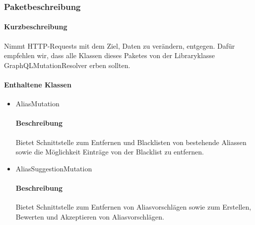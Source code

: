 \subsubsection*{Paketbeschreibung}%
\paragraph*{Kurzbeschreibung}
Nimmt HTTP-Requests mit dem Ziel, Daten zu verändern, entgegen.
Dafür empfehlen wir, dass alle Klassen dieses Paketes von der Libraryklasse \dq GraphQLMutationResolver \dq erben sollten.
\paragraph*{Enthaltene Klassen}
\begin{itemize}
    \item AliasMutation
    		\paragraph*{Beschreibung}
            Bietet Schnittstelle zum Entfernen und Blacklisten von bestehende Aliassen sowie die Möglichkeit Einträge von der Blacklist zu entfernen.
    \item AliasSuggestionMutation
    		\paragraph*{Beschreibung}
    		Bietet Schnittstelle zum Entfernen von Aliasvorschlägen sowie zum Erstellen, Bewerten und Akzeptieren von Aliasvorschlägen.
\end{itemize}